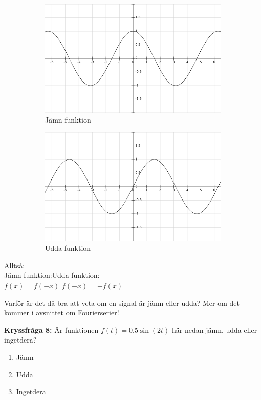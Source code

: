 \documentclass{article}
\begin{document}
\begin{figure}[ht]
\centering
\begin{subfigure}{0.50\textwidth}
  \centering
  \includegraphics[width=0.90\linewidth]{image09.png}
  \caption{Jämn funktion}
  \label{}
\end{subfigure}%
\begin{subfigure}{0.50\textwidth}
  \centering
  \includegraphics[width=0.90\linewidth]{image14.png}
  \caption{Udda funktion}
 \label{}
\end{subfigure}%
\caption{}
\label{}
\end{figure}



Alltså:\\
Jämn funktion:\hfill Udda funktion: \\
$ f(x)=f(-x)$ \hfill $f(-x)=-f(x) $

Varför är det då bra att veta om en signal är jämn eller udda? Mer om det kommer i avsnittet om Fourierserier!

\newpage

\textbf{Kryssfråga 8:} Är funktionen $f(t)=0.5\sin(2t)$ här nedan jämn, udda eller ingetdera?
\begin{enumerate}[label={\alph*)},font={\bfseries}]
    \item Jämn
    \item Udda
    \item Ingetdera
\end{enumerate}
\end{document}
